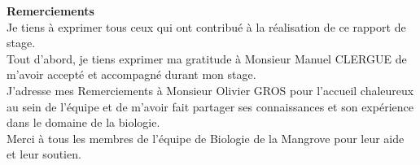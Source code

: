 \vspace*{\fill}
    \begin{center}
        \textbf{\large{Remerciements}} \\[2cm]
        Je tiens à exprimer tous ceux qui ont contribué à la réalisation de ce rapport de stage. \\[0.5cm]

        Tout d'abord, je tiens exprimer ma gratitude à Monsieur Manuel CLERGUE de m'avoir accepté et accompagné durant mon stage. \\[0.5cm]

        J'adresse mes Remerciements à Monsieur Olivier GROS pour l'accueil chaleureux au sein de l'équipe et de m'avoir fait partager ses connaissances et son expérience dans le domaine de la biologie. \\[0.5cm]

        Merci à tous les membres de l'équipe de Biologie de la Mangrove pour leur aide et leur soutien. \\[0.5cm]
    \end{center}
\vspace*{\fill}